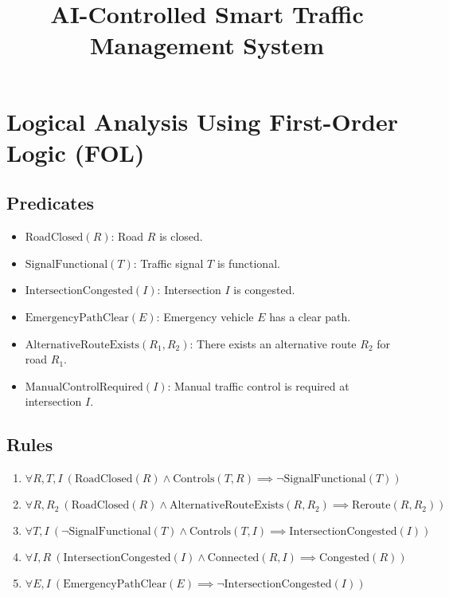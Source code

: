 \documentclass[12pt]{article}
\title{AI-Controlled Smart Traffic Management System}
\author{}
\date{}
\begin{document}
\maketitle

\section*{Logical Analysis Using First-Order Logic (FOL)}

\subsection*{Predicates}
\begin{itemize}
    \item $\text{RoadClosed}(R)$: Road $R$ is closed.
    \item $\text{SignalFunctional}(T)$: Traffic signal $T$ is functional.
    \item $\text{IntersectionCongested}(I)$: Intersection $I$ is congested.
    \item $\text{EmergencyPathClear}(E)$: Emergency vehicle $E$ has a clear path.
    \item $\text{AlternativeRouteExists}(R_1, R_2)$: There exists an alternative route $R_2$ for road $R_1$.
    \item $\text{ManualControlRequired}(I)$: Manual traffic control is required at intersection $I$.
\end{itemize}

\subsection*{Rules}
\begin{enumerate}
    \item $\forall R, T, I \ (\text{RoadClosed}(R) \land \text{Controls}(T, R) \implies \neg \text{SignalFunctional}(T))$
    \item $\forall R, R_2 \ (\text{RoadClosed}(R) \land \text{AlternativeRouteExists}(R, R_2) \implies \text{Reroute}(R, R_2))$
    \item $\forall T, I \ (\neg \text{SignalFunctional}(T) \land \text{Controls}(T, I) \implies \text{IntersectionCongested}(I))$
    \item $\forall I, R \ (\text{IntersectionCongested}(I) \land \text{Connected}(R, I) \implies \text{Congested}(R))$
    \item $\forall E, I \ (\text{EmergencyPathClear}(E) \implies \neg \text{IntersectionCongested}(I))$
\end{enumerate}
\end{document}

